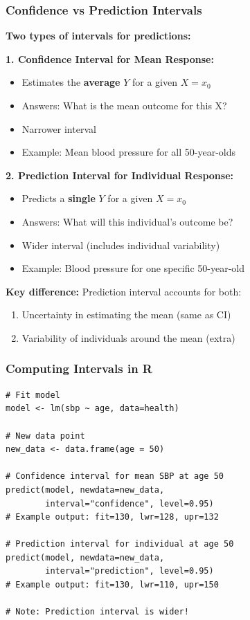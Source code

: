 \documentclass{beamer}
\begin{document}
\begin{frame}
\frametitle{Confidence vs Prediction Intervals}
\textbf{Two types of intervals for predictions:}

\vspace{0.3cm}
\textbf{1. Confidence Interval for Mean Response:}
\begin{itemize}
\item Estimates the \textbf{average} $Y$ for a given $X = x_0$
\item Answers: What is the mean outcome for this X?
\item Narrower interval
\item Example: Mean blood pressure for all 50-year-olds
\end{itemize}

\vspace{0.3cm}
\textbf{2. Prediction Interval for Individual Response:}
\begin{itemize}
\item Predicts a \textbf{single} $Y$ for a given $X = x_0$
\item Answers: What will this individual's outcome be?
\item Wider interval (includes individual variability)
\item Example: Blood pressure for one specific 50-year-old
\end{itemize}

\vspace{0.3cm}
\textbf{Key difference:} Prediction interval accounts for both:
\begin{enumerate}
\item Uncertainty in estimating the mean (same as CI)
\item Variability of individuals around the mean (extra)
\end{enumerate}
\end{frame}

\begin{frame}[fragile]
\frametitle{Computing Intervals in R}
\small
\begin{verbatim}
# Fit model
model <- lm(sbp ~ age, data=health)

# New data point
new_data <- data.frame(age = 50)

# Confidence interval for mean SBP at age 50
predict(model, newdata=new_data,
        interval="confidence", level=0.95)
# Example output: fit=130, lwr=128, upr=132

# Prediction interval for individual at age 50
predict(model, newdata=new_data,
        interval="prediction", level=0.95)
# Example output: fit=130, lwr=110, upr=150

# Note: Prediction interval is wider!
\end{verbatim}
\end{frame}
\end{document}
